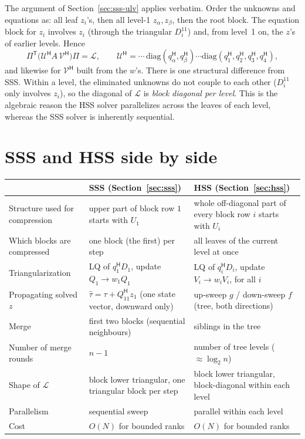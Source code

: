 \documentclass[11pt]{article}
\newcommand{\ct}{^{\mathsf H}}            %
\newcommand{\htau}{\hat\tau}
\theoremstyle{definition}
\begin{document}
The argument of Section~\ref{sec:sss-ulv} applies verbatim. Order the
unknowns and equations as: all leaf $z_i$'s, then all level-1 $z_\alpha,z_\beta$,
then the root block. The equation block for $z_i$ involves $z_i$ (through the
triangular $D_i^{11}$) and, from level~1 on, the $z$'s of earlier levels.
Hence
\[
\Pi^{\mathsf T}\bigl(\mathcal U\ct A\,\mathcal V\ct\bigr)\Pi = \mathcal L,
\qquad
\mathcal U\ct = \cdots\,\mathrm{diag}(q_\alpha\ct,q_\beta\ct)\cdots\mathrm{diag}(q_1\ct,q_2\ct,q_3\ct,q_4\ct),
\]
and likewise for $\mathcal V\ct$ built from the $w$'s. There is one structural
difference from SSS. Within a level, the eliminated unknowns do not couple to
each other ($D_i^{11}$ only involves $z_i$), so the diagonal of $\mathcal L$
is \emph{block diagonal per level}. This is the algebraic reason the HSS
solver parallelizes across the leaves of each level, whereas the SSS solver
is inherently sequential.

\section{SSS and HSS side by side}

\begin{center}
\renewcommand{\arraystretch}{1.25}
\begin{tabular}{@{}p{}p{}p{}@{}}
\toprule
 & \textbf{SSS} (Section~\ref{sec:sss}) & \textbf{HSS} (Section~\ref{sec:hss})\\
\midrule
Structure used for compression &
upper part of block row $1$ starts with $U_1$ &
whole off-diagonal part of every block row $i$ starts with $U_i$\\
Which blocks are compressed &
one block (the first) per step &
all leaves of the current level at once\\
Triangularization &
LQ of $q_1\ct D_1$, update $Q_1\to w_1Q_1$ &
LQ of $q_i\ct D_i$, update $V_i\to w_iV_i$, for all $i$\\
Propagating solved $z$ &
$\htau = \tau + Q_{11}\ct z_1$ (one state vector, downward only) &
up-sweep $g$ / down-sweep $f$ (tree, both directions)\\
Merge &
first two blocks (sequential neighbours) &
siblings in the tree\\
Number of merge rounds &
$n-1$ &
number of tree levels ($\approx\log_2 n$)\\
Shape of $\mathcal L$ &
block lower triangular, one triangular block per step &
block lower triangular, block-diagonal within each level\\
Parallelism &
sequential sweep &
parallel within each level\\
Cost &
$O(N)$ for bounded ranks &
$O(N)$ for bounded ranks\\
\bottomrule
\end{tabular}
\end{center}
\end{document}
